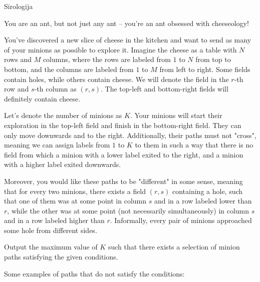 \begin{statement}[
  problempoints=100,
  timelimit=1 second,
  memorylimit=1024 MiB,
]{Sirologija}

You are an ant, but not just any ant – you're an ant obsessed with cheeseology!

You've discovered a new slice of cheese in the kitchen and want to send as many of your minions as possible to explore it. Imagine the cheese as a table with $N$ rows and $M$ columns, where the rows are labeled from $1$ to $N$ from top to bottom, and the columns are labeled from $1$ to $M$ from left to right. Some fields contain holes, while others contain cheese. We will denote the field in the $r$-th row and $s$-th column as $(r, s)$. The top-left and bottom-right fields will definitely contain cheese.

Let's denote the number of minions as $K$. Your minions will start their exploration in the top-left field and finish in the bottom-right field. They can only move downwards and to the right. Additionally, their paths must not "cross", meaning we can assign labels from $1$ to $K$ to them in such a way that there is no field from which a minion with a lower label exited to the right, and a minion with a higher label exited downwards.

Moreover, you would like these paths to be "different" in some sense, meaning that for every two minions, there exists a field $(r, s)$ containing a hole, such that one of them was at some point in column $s$ and in a row labeled lower than $r$, while the other was at some point (not necessarily simultaneously) in column $s$ and in a row labeled higher than $r$. Informally, every pair of minions approached some hole from different sides.

Output the maximum value of $K$ such that there exists a selection of minion paths satisfying the given conditions.

Some examples of paths that do not satisfy the conditions:


\end{statement}

